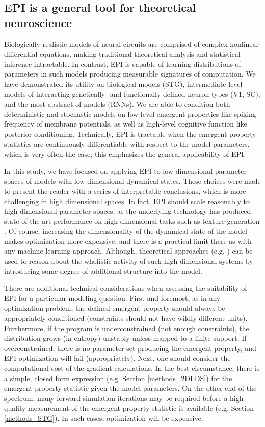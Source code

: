 \documentclass[11pt]{article}
\begin{document}
\subsection{EPI is a general tool for theoretical neuroscience} 
Biologically realistic models of neural circuits are comprised of complex nonlinear differential equations, making traditional theoretical analysis and statistical inference intractable. 
In contrast, EPI is capable of learning distributions of parameters in such models producing measurable signatures of computation.
We have demonstrated its utility on biological models (STG), intermediate-level models of interacting genetically- and functionally-defined neuron-types (V1, SC), and the most abstract of models (RNNs).  
We are able to condition both deterministic and stochastic models on low-level emergent properties like spiking frequency of membrane potentials, as well as high-level cognitive function like posterior conditioning.
Technically, EPI is tractable when the emergent property statistics are continuously differentiable with respect to the model parameters, which is very often the case; this emphasizes the general applicability of EPI.

In this study, we have focused on applying EPI to low dimensional parameter spaces of models with low dimensional dynamical states.
These choices were made to present the reader with a series of  interpretable conclusions, which is more challenging in high dimensional spaces.
In fact, EPI should scale reasonably to high dimensional parameter spaces, as the underlying technology has produced state-of-the-art performance on high-dimensional tasks such as texture generation \cite{loaiza2017maximum}.
Of course, increasing the dimensionality of the dynamical state of the model makes optimization more expensive, and there is a practical limit there as with any machine learning approach.
Although, theoretical approaches (e.g. \cite{mastrogiuseppe2018linking}) can be used to reason about the wholistic activity of such high dimensional systems by introducing some degree of additional structure into the model.

There are additional technical considerations when assessing the suitability of EPI for a particular modeling question.  
First and foremost, as in any optimization problem, the defined emergent property should always be appropriately conditioned (constraints should not have wildly different units).  
Furthermore, if the program is underconstrained (not enough constraints), the distribution grows (in entropy) unstably unless mapped to a finite support.  
If overconstrained, there is no parameter set producing the emergent property, and EPI optimization will fail (appropriately).
Next, one should consider the computational cost of the gradient calculations. 
In the best circumstance, there is a simple, closed form expression (e.g. Section \ref{methods_2DLDS}) for the emergent property statistic given the model parameters.  
On the other end of the spectrum, many forward simulation iterations may be required before a high quality measurement of the emergent property statistic is available  (e.g. Section \ref{methods_STG}).  In such cases, optimization will be expensive.
\end{document}
